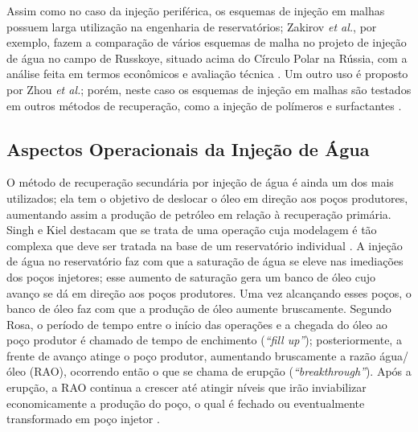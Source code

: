 Assim como no caso da inje\c{c}\~{a}o perif\'{e}rica, os esquemas de inje\c{c}\~{a}o em malhas possuem larga utiliza\c{c}\~{a}o na engenharia de reservat\'{o}rios; Zakirov \textit{et al.}, por exemplo, fazem a compara\c{c}\~{a}o de v\'{a}rios esquemas de malha no projeto de inje\c{c}\~{a}o de \'{a}gua no campo de Russkoye, situado acima do C\'{i}rculo Polar na R\'{u}ssia, com a an\'{a}lise feita em termos econ\^{o}micos e avalia\c{c}\~{a}o t\'{e}cnica \cite{zakirov2012}. Um outro uso \'{e} proposto por Zhou \textit{et al.}; por\'{e}m, neste caso os esquemas de inje\c{c}\~{a}o em malhas s\~{a}o testados em outros m\'{e}todos de recupera\c{c}\~{a}o, como a inje\c{c}\~{a}o de pol\'{i}meros e surfactantes \cite{zhou2016}.

\subsection{Aspectos Operacionais da Inje\c{c}\~{a}o de \'{A}gua}

O m\'{e}todo de recupera\c{c}\~{a}o secund\'{a}ria por inje\c{c}\~{a}o de \'{a}gua \'{e} ainda um dos mais utilizados; ela tem o objetivo de deslocar o \'{o}leo em dire\c{c}\~{a}o aos po\c{c}os produtores, aumentando assim a produ\c{c}\~{a}o de petr\'{o}leo em rela\c{c}\~{a}o \`{a} recupera\c{c}\~{a}o prim\'{a}ria. Singh e Kiel destacam que se trata de uma opera\c{c}\~{a}o cuja modelagem \'{e} t\~{a}o complexa que deve ser tratada na base de um reservat\'{o}rio individual \cite{singh1982}.
A inje\c{c}\~{a}o de \'{a}gua no reservat\'{o}rio faz com que a satura\c{c}\~{a}o de \'{a}gua se eleve nas imedia\c{c}\~{o}es dos po\c{c}os injetores; esse aumento de satura\c{c}\~{a}o gera um banco de \'{o}leo cujo avan\c{c}o se d\'{a} em dire\c{c}\~{a}o aos po\c{c}os produtores. Uma vez alcan\c{c}ando esses po\c{c}os, o banco de \'{o}leo faz com que a produ\c{c}\~{a}o de \'{o}leo aumente bruscamente. Segundo Rosa, o per\'{i}odo de tempo entre o in\'{i}cio das opera\c{c}\~{o}es e a chegada do \'{o}leo ao po\c{c}o produtor \'{e} chamado de tempo de enchimento (\textit{``fill up''}); posteriormente, a frente de avan\c{c}o atinge o po\c{c}o produtor, aumentando bruscamente a raz\~{a}o \'{a}gua/\'{o}leo (RAO), ocorrendo ent\~{a}o o que se chama de erup\c{c}\~{a}o (\textit{``breakthrough''}). Ap\'{o}s a erup\c{c}\~{a}o, a RAO continua a crescer at\'{e} atingir n\'{i}veis que ir\~{a}o inviabilizar economicamente a produ\c{c}\~{a}o do po\c{c}o, o qual \'{e} fechado ou eventualmente transformado em po\c{c}o injetor \cite{engres}.

